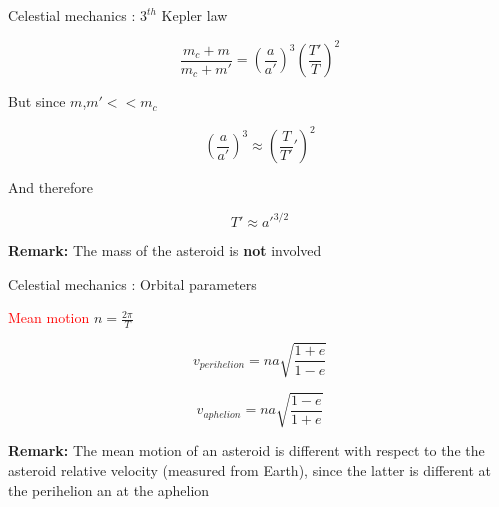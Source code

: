 \documentclass{beamer}
\begin{document}
\begin{frame}{Celestial mechanics \cite{murray1999solar}: $3^{th}$ Kepler law}


\begin{equation}
\frac{m_{c}+m}{m_{c}+m'}=\left(\frac{a}{a'}\right)^{3}\left(\frac{T'}{T}\right)^{2}
\end{equation}

But since $m$,$m'<<m_{c}$

\begin{equation}
\left(\frac{a}{a'}\right)^{3}\approx \left(\frac{T}{T'}'\right)^{2}
\end{equation}

And therefore 

\begin{equation}
T'\approx a'^{3/2}
\end{equation}

\begin{center}
\textbf{Remark:} The mass of the asteroid is \textbf{not} involved
\end{center}


\end{frame}

\begin{frame}{Celestial mechanics \cite{murray1999solar}: Orbital parameters}
\begin{center}
\textcolor{red}{Mean motion} $n=\frac{2\pi}{T}$
\end{center}

\begin{equation}
v_{perihelion}=na\sqrt{\dfrac{1+e}{1-e}}
\end{equation}

\begin{equation}
v_{aphelion}=na\sqrt{\dfrac{1-e}{1+e}}
\end{equation}

\begin{center}
\textbf{Remark:} The mean motion of an asteroid is different with respect to the the asteroid relative velocity (measured from Earth), since the latter is different at the perihelion an at the aphelion
\end{center}



\end{frame}
\end{document}
